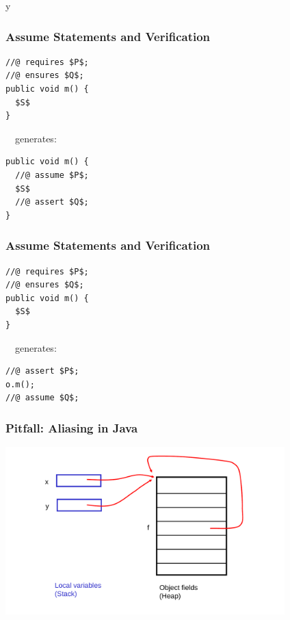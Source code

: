 \if y\MAKEHANDOUTS \documentclass[t,compress,landscape,handout]{beamer}
\begin{document}
\begin{frame}[fragile]
\frametitle{Assume Statements and Verification}

\begin{lstlisting}[mathescape=true]
//@ requires $P$;
//@ ensures $Q$;
public void m() {
  $S$
}
\end{lstlisting}

~~generates:

\begin{lstlisting}[mathescape=true]
public void m() {
  //@ assume $P$;
  $S$
  //@ assert $Q$;
}
\end{lstlisting}
\end{frame}

\begin{frame}[fragile]
\frametitle{Assume Statements and Verification}

\begin{lstlisting}[mathescape=true]
//@ requires $P$;
//@ ensures $Q$;
public void m() {
  $S$
}
\end{lstlisting}

~~generates:

\begin{lstlisting}[mathescape=true]
//@ assert $P$;
o.m();
//@ assume $Q$;
\end{lstlisting}

\end{frame}

\begin{frame}
\frametitle{Pitfall: Aliasing in Java}
\includegraphics[width=4.25in]{aliasxy}
\end{frame}
\end{document}
